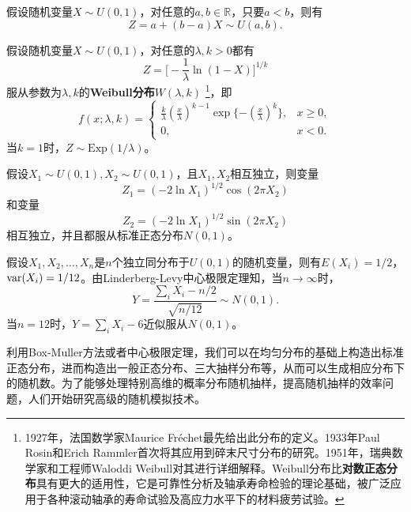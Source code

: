 \begin{property}
假设随机变量$X\sim U(0,1)$，对任意的$a,b\in \mathbb R$，只要$a<b$，则有
\[
    Z = a + (b-a)X\sim U(a,b).
\]
\end{property}
\begin{property}
假设随机变量$X\sim U(0,1)$，对任意的$\lambda,k>0$都有
\[
    Z=\big[-\frac{1}{\lambda}\ln(1-X)\big]^{1/k}
\]
服从参数为$\lambda,k$的\textbf{Weibull分布}$W(\lambda,k)$
\footnote{1927年，法国数学家Maurice Fr\'{e}chet\cite{frechet1927loi}最先给出此分布的定义。1933年Paul Rosin和Erich Rammler\cite{rossin1933laws}首次将其应用到碎末尺寸分布的研究。1951年，瑞典数学家和工程师Waloddi Weibull\cite{weibull1951statistical}对其进行详细解释。Weibull分布比\textbf{对数正态分布}具有更大的适用性，它是可靠性分析及轴承寿命检验的理论基础，被广泛应用于各种滚动轴承的寿命试验及高应力水平下的材料疲劳试验。}，即
\begin{equation}
    f(x;\lambda,k) = \left\{
        \begin{array}{ll}
            \frac{k}{\lambda} (\frac{x}{\lambda})^{k-1} \exp\{-(\frac{x}{\lambda})^k\}, & x\ge 0,\\
            0,& x<0.
        \end{array}
    \right.
\end{equation}
当$k=1$时，$Z\sim \mathrm{Exp}(1/\lambda)$。
\end{property}

\begin{theorem}
假设$X_1\sim U(0,1), X_2\sim U(0,1)$，且$X_1,X_2$相互独立，则变量
\[
    Z_1=(-2\ln X_1)^{1/2} \cos (2\pi X_2)
\]
和变量
\[
    Z_2=(-2\ln X_1)^{1/2} \sin (2\pi X_2)
\]
相互独立，并且都服从标准正态分布$N(0,1)$。
\end{theorem}

\begin{theorem}
假设$X_1,X_2,\ldots,X_n$是$n$个独立同分布于$U(0,1)$的随机变量，则有$E(X_i)=1/2$，$\operatorname{\mathrm{var}}(X_i)=1/12$。由Linderberg-Levy中心极限定理知，当$n\rightarrow \infty$时，
\begin{equation}
    Y = \frac{\sum\limits_i X_i - n/2}{\sqrt{n/12}} \sim N(0,1).
\end{equation}
当$n=12$时，$Y=\sum\limits_i X_i - 6$近似服从$N(0,1)$。
\end{theorem}
利用Box-Muller方法或者中心极限定理，我们可以在均匀分布的基础上构造出标准正态分布，进而构造出一般正态分布、三大抽样分布等，从而可以生成相应分布下的随机数。为了能够处理特别高维的概率分布随机抽样，提高随机抽样的效率问题，人们开始研究高级的随机模拟技术。

